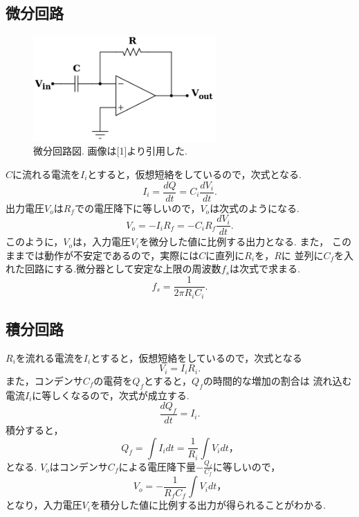 \documentclass[twocolumn, 10pt,a4j]{jsarticle}
\begin{document}
  \subsection{微分回路}
      \begin{figure}[H]
        \begin{center}
            \includegraphics[width=7cm]{../img/bibun_kairo.png}
            \caption{微分回路図. 画像は[1]より引用した.}
        \end{center}
      \end{figure}
    $C$に流れる電流を$I_{i}$とすると，仮想短絡をしているので，次式となる.
      \begin{equation}
        I_{i} = \frac{dQ}{dt} = C_{i}\frac{dV_{i}}{dt}.
      \end{equation}
    出力電圧$V_{o}$は$R_{f}$での電圧降下に等しいので，$V_{o}$は次式のようになる.
      \begin{equation}
        V_{o} = - I_{i} R_{f} = - C_{i} R_{f} \frac{dV_{i}}{dt}.
      \end{equation}
    このように，$V_{o}$は，入力電圧$V_{i}$を微分した値に比例する出力となる. また，
    このままでは動作が不安定であるので，実際には$C$に直列に$R_{i}$を，$R$に
    並列に$C_{f}$を入れた回路にする.微分器として安定な上限の周波数$f_{s}$は次式で求まる.
      \begin{equation}
        f_{s} = \frac{1}{2 \pi R_{i} C_{i}}.
      \end{equation}


  \subsection{積分回路}
      $R_{i}$を流れる電流を$I_{i}$とすると，仮想短絡をしているので，次式となる
        \begin{equation}
          V_{i} = I_{i} R_{i}.
        \end{equation}  
      また，コンデンサ$C_{f}$の電荷を$Q_{f}$とすると，$Q_{f}$の時間的な増加の割合は
      流れ込む電流$I_{i}$に等しくなるので，次式が成立する.
        \begin{equation}
          \frac{dQ_{f}}{dt} = I_{i}.
        \end{equation}
      積分すると，
        \begin{equation}
          Q_{f} = \int I_{i} dt = \frac{1}{R_{i}} \int V_{i} dt，
        \end{equation}
      となる. $V_{o}$はコンデンサ$C_{f}$による電圧降下量$- \frac{Q_{f}}{C_{f}}$に等しいので，
        \begin{equation}
          V_{o} = - \frac{1}{R_{f}C_{f}} \int V_{i} dt，
        \end{equation}
      となり，入力電圧$V_{i}$を積分した値に比例する出力が得られることがわかる.
\end{document}
